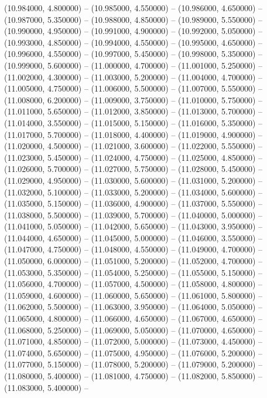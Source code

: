(10.984000, 4.800000) -- 
(10.985000, 4.550000) -- 
(10.986000, 4.650000) -- 
(10.987000, 5.350000) -- 
(10.988000, 4.850000) -- 
(10.989000, 5.550000) -- 
(10.990000, 4.950000) -- 
(10.991000, 4.900000) -- 
(10.992000, 5.050000) -- 
(10.993000, 4.850000) -- 
(10.994000, 4.550000) -- 
(10.995000, 4.650000) -- 
(10.996000, 4.550000) -- 
(10.997000, 5.450000) -- 
(10.998000, 5.350000) -- 
(10.999000, 5.600000) -- 
(11.000000, 4.700000) -- 
(11.001000, 5.250000) -- 
(11.002000, 4.300000) -- 
(11.003000, 5.200000) -- 
(11.004000, 4.700000) -- 
(11.005000, 4.750000) -- 
(11.006000, 5.500000) -- 
(11.007000, 5.550000) -- 
(11.008000, 6.200000) -- 
(11.009000, 3.750000) -- 
(11.010000, 5.750000) -- 
(11.011000, 5.650000) -- 
(11.012000, 3.850000) -- 
(11.013000, 5.700000) -- 
(11.014000, 3.550000) -- 
(11.015000, 5.150000) -- 
(11.016000, 5.350000) -- 
(11.017000, 5.700000) -- 
(11.018000, 4.400000) -- 
(11.019000, 4.900000) -- 
(11.020000, 4.500000) -- 
(11.021000, 3.600000) -- 
(11.022000, 5.550000) -- 
(11.023000, 5.450000) -- 
(11.024000, 4.750000) -- 
(11.025000, 4.850000) -- 
(11.026000, 5.700000) -- 
(11.027000, 5.750000) -- 
(11.028000, 5.450000) -- 
(11.029000, 4.950000) -- 
(11.030000, 5.600000) -- 
(11.031000, 5.200000) -- 
(11.032000, 5.100000) -- 
(11.033000, 5.200000) -- 
(11.034000, 5.600000) -- 
(11.035000, 5.150000) -- 
(11.036000, 4.900000) -- 
(11.037000, 5.550000) -- 
(11.038000, 5.500000) -- 
(11.039000, 5.700000) -- 
(11.040000, 5.000000) -- 
(11.041000, 5.050000) -- 
(11.042000, 5.650000) -- 
(11.043000, 3.950000) -- 
(11.044000, 4.650000) -- 
(11.045000, 5.000000) -- 
(11.046000, 3.550000) -- 
(11.047000, 4.750000) -- 
(11.048000, 4.550000) -- 
(11.049000, 4.700000) -- 
(11.050000, 6.000000) -- 
(11.051000, 5.200000) -- 
(11.052000, 4.700000) -- 
(11.053000, 5.350000) -- 
(11.054000, 5.250000) -- 
(11.055000, 5.150000) -- 
(11.056000, 4.700000) -- 
(11.057000, 4.500000) -- 
(11.058000, 4.800000) -- 
(11.059000, 4.600000) -- 
(11.060000, 5.650000) -- 
(11.061000, 5.800000) -- 
(11.062000, 5.500000) -- 
(11.063000, 3.950000) -- 
(11.064000, 5.050000) -- 
(11.065000, 4.800000) -- 
(11.066000, 4.650000) -- 
(11.067000, 4.650000) -- 
(11.068000, 5.250000) -- 
(11.069000, 5.050000) -- 
(11.070000, 4.650000) -- 
(11.071000, 4.850000) -- 
(11.072000, 5.000000) -- 
(11.073000, 4.450000) -- 
(11.074000, 5.650000) -- 
(11.075000, 4.950000) -- 
(11.076000, 5.200000) -- 
(11.077000, 5.150000) -- 
(11.078000, 5.200000) -- 
(11.079000, 5.200000) -- 
(11.080000, 5.400000) -- 
(11.081000, 4.750000) -- 
(11.082000, 5.850000) -- 
(11.083000, 5.400000) -- 
